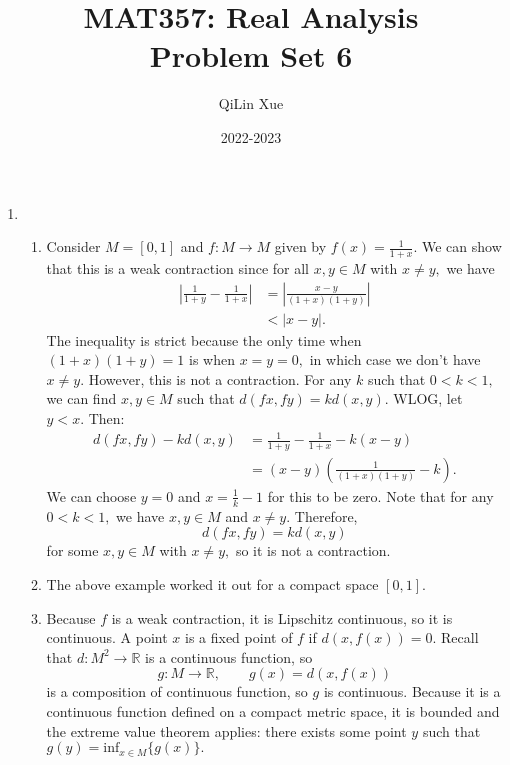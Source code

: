 \documentclass{article}
\title{\vspace{-2cm}MAT357: Real Analysis \\ Problem Set 6}
\author{QiLin Xue}
\date{2022-2023}
\numberwithin{equation}{section}
\begin{document}
\maketitle
\begin{enumerate}
    \item \begin{enumerate}[label=(\alph*)]
        \item Consider $M=[0,1]$ and $f:M\to M$ given by $f(x) = \frac{1}{1+x}.$ We can show that this is a weak contraction since for all $x,y\in M$ with $x\neq y,$ we have
        \begin{align}
            \left|\frac{1}{1+y}-\frac{1}{1+x}\right| &= \left|\frac{x-y}{(1+x)(1+y)}\right|\\
            & < |x-y|.
        \end{align}
        The inequality is strict because the only time when $(1+x)(1+y)=1$ is when $x=y=0,$ in which case we don't have $x\neq y.$ However, this is not a contraction. For any $k$ such that $0<k<1,$ we can find $x,y\in M$ such that $d(fx,fy) = k d(x,y).$ WLOG, let $y < x.$ Then:
        \begin{align}
            d(fx,fy) - kd(x,y) &= \frac{1}{1+y}-\frac{1}{1+x} - k(x-y) \\ 
            &= (x-y)\left(\frac{1}{(1+x)(1+y)}-k\right).
        \end{align}
        We can choose $y=0$ and $x = \frac{1}{k}-1$ for this to be zero. Note that for any $0<k<1,$ we have $x,y\in M$ and $x\neq y.$ Therefore,
        \begin{equation}
            d(fx,fy) = kd(x,y)
        \end{equation}
        for some $x,y\in M$ with $x\neq y,$ so it is not a contraction.
        \item The above example worked it out for a compact space $[0,1].$
        \item Because $f$ is a weak contraction, it is Lipschitz continuous, so it is continuous. A point $x$ is a fixed point of $f$ if $d(x,f(x))=0.$ Recall that $d:M^2 \to \mathbb{R}$ is a continuous function, so 
        \begin{equation}
            g: M\to \mathbb{R},\qquad g(x) = d(x,f(x))
        \end{equation} 
        is a composition of continuous function, so $g$ is continuous. Because it is a continuous function defined on a compact metric space, it is bounded and the extreme value theorem applies: there exists some point $y$ such that $g(y)=\text{inf}_{x\in M}\{g(x)\}.$ 
        

\end{enumerate}
\end{enumerate}
\end{document}
